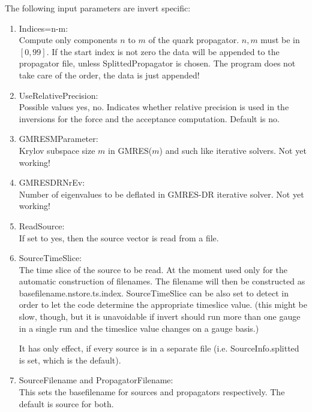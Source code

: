 The following input parameters are {\ttfamily invert} specific:
\begin{enumerate}
\item {\ttfamily Indices=n-m}:\\
  Compute only components $n$ to $m$ of the quark propagator. $n,m$ must
  be in $[0,99]$. If the start index is not zero the data will be
  appended to the propagator file, unless {\ttfamily
    SplittedPropagator} is chosen. The program does not take care of the
  order, the data is just appended!

\item {\ttfamily UseRelativePrecision}:\\
  Possible values {\ttfamily yes, no}. Indicates whether relative
  precision is used in the inversions for the force and the acceptance
  computation. Default is no.
  
\item {\ttfamily GMRESMParameter}:\\
  Krylov subspace size $m$ in GMRES($m$) and such like iterative
  solvers. Not yet working!

\item {\ttfamily GMRESDRNrEv}:\\
  Number of eigenvalues to be deflated in GMRES-DR iterative
  solver. Not yet working!

\item {\ttfamily ReadSource}:\\
  If set to yes, then the source vector is read from a file.

\item {\ttfamily SourceTimeSlice}:\\
  The time slice of the source to be read. At
  the moment used only for
  the automatic construction of filenames. The filename will then be
  constructed as {\ttfamily basefilename.nstore.ts.index}.
  {\ttfamily SourceTimeSlice} can be also set to {\ttfamily detect} in
  order to let the code determine the appropriate timeslice
  value. (this might be slow, though, but it is unavoidable if
  {\ttfamily invert} should run more than one gauge in a single run
  and the timeslice value changes on a gauge basis.)

  It has only effect, if every source is in a separate file
  (i.e. SourceInfo.splitted is set, which is the default).

\item {\ttfamily SourceFilename} and {\ttfamily PropagatorFilename}:\\
  This sets the basefilename for sources and propagators respectively.
  The default is {\ttfamily source} for both.


\end{enumerate}
